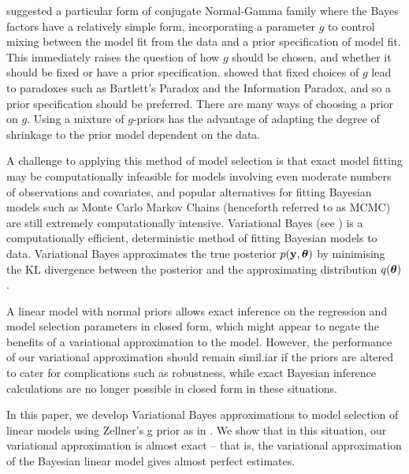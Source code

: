 \documentclass{amsart}[12pt]
\begin{document}
\cite{Zellner1980} suggested a particular form of conjugate Normal-Gamma family where the Bayes factors have a
relatively simple form, incorporating a parameter $g$ to control mixing between the model fit from the data
and a prior specification of model fit. This immediately raises the question of how $g$ should be chosen, and
whether it should be fixed or have a prior specification. \cite{Liang2008} showed that fixed choices of $g$
lead to paradoxes such as Bartlett's Paradox and the Information Paradox, and so a prior specification should
be preferred. There are many ways of choosing a prior on $g$. Using a mixture of $g$-priors has the advantage
of adapting the degree of shrinkage to the prior model dependent on the data.



A challenge to applying this method of model selection is that exact model fitting may be computationally
infeasible for models involving even moderate numbers of observations and covariates, and popular alternatives
for fitting Bayesian models such as Monte Carlo Markov Chains (henceforth referred to as MCMC) are still
extremely computationally intensive. Variational Bayes (see \cite{Ormerod2010}) is a computationally
efficient, deterministic method of fitting Bayesian models to data. Variational Bayes approximates the true
posterior $p({\bf y}, {\boldsymbol \theta})$ by minimising the KL divergence between the posterior and the  approximating
distribution $q({\boldsymbol \theta})$.

A linear model with normal priors allows exact inference on the regression and model selection parameters in
closed form, which might appear to negate the benefits of a variational approximation to the model. However,
the performance of our variational approximation should remain simil.iar if the priors are altered to cater
for complications such as robustness, while exact Bayesian inference calculations are no longer possible
in closed form in these situations.






In this paper, we develop Variational Bayes approximations to model selection of linear models using Zellner's
g prior as in \cite{Liang2008}. We show that in this situation, our variational approximation is almost exact
-- that is, the variational approximation of the Bayesian linear model gives almost perfect estimates.
\end{document}
